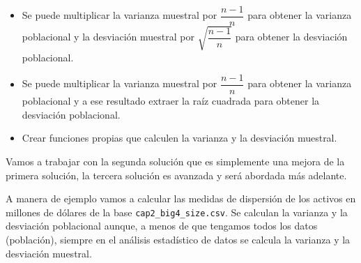 \documentclass[letterpaper,]{book}
\newenvironment{Shaded}{\begin{snugshade}}{\end{snugshade}}
\newcommand{\DataTypeTok}[1]{\textcolor[rgb]{0.13,0.29,0.53}{#1}}
\newcommand{\DecValTok}[1]{\textcolor[rgb]{0.00,0.00,0.81}{#1}}
\newcommand{\KeywordTok}[1]{\textcolor[rgb]{0.13,0.29,0.53}{\textbf{#1}}}
\newcommand{\NormalTok}[1]{#1}
\newcommand{\OperatorTok}[1]{\textcolor[rgb]{0.81,0.36,0.00}{\textbf{#1}}}
\newcommand{\StringTok}[1]{\textcolor[rgb]{0.31,0.60,0.02}{#1}}
\providecommand{\tightlist}{%
  \setlength{\itemsep}{0pt}\setlength{\parskip}{0pt}}
\begin{document}
\begin{itemize}
\tightlist
\item
  Se puede multiplicar la varianza muestral por \(\dfrac{n-1}{n}\) para obtener la varianza poblacional y la desviación muestral por \(\sqrt{\dfrac{n-1}{n}}\) para obtener la desviación poblacional.
\item
  Se puede multiplicar la varianza muestral por \(\dfrac{n-1}{n}\) para obtener la varianza poblacional y a ese resultado extraer la raíz cuadrada para obtener la desviación poblacional.
\item
  Crear funciones propias que calculen la varianza y la desviación muestral.
\end{itemize}

Vamos a trabajar con la segunda solución que es simplemente una mejora de la primera solución, la tercera solución es avanzada y será abordada más adelante.

A manera de ejemplo vamos a calcular las medidas de dispersión de los activos en millones de dólares de la base \texttt{cap2\_big4\_size.csv}. Se calculan la varianza y la desviación poblacional aunque, a menos de que tengamos todos los datos (población), siempre en el análisis estadístico de datos se calcula la varianza y la desviación muestral.

\begin{Shaded}
\end{Shaded}
\end{document}

